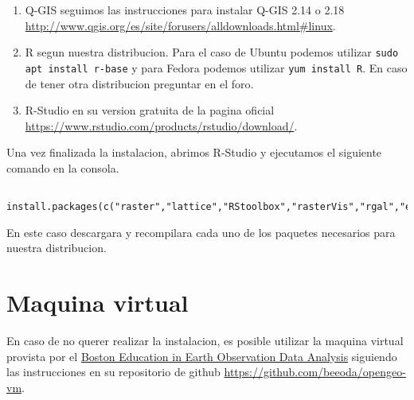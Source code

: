 \begin{enumerate}
  \item Q-GIS seguimos las instrucciones para instalar Q-GIS 2.14 o 2.18 \url{http://www.qgis.org/es/site/forusers/alldownloads.html#linux}.
  \item R segun nuestra distribucion. Para el caso de Ubuntu podemos utilizar \texttt{sudo apt install r-base} y para Fedora podemos utilizar \texttt{yum install R}. En caso de tener otra distribucion preguntar en el foro.
  \item R-Studio en su version gratuita de la pagina oficial \url{https://www.rstudio.com/products/rstudio/download/}.
\end{enumerate}

Una vez finalizada la instalacion, abrimos R-Studio y ejecutamos el siguiente comando en la consola.

\begin{lstlisting}
  install.packages(c("raster","lattice","RStoolbox","rasterVis","rgal","e1071","randomForest","kernlab"))
\end{lstlisting}

En este caso descargara y recompilara cada uno de los paquetes necesarios para nuestra distribucion.

\section{Maquina virtual}

En caso de no querer realizar la instalacion, es posible utilizar la maquina virtual provista por el \href{www.beeoda.org}{Boston Education in Earth Observation Data Analysis} siguiendo las instrucciones en su repositorio de github \url{https://github.com/beeoda/opengeo-vm}.

